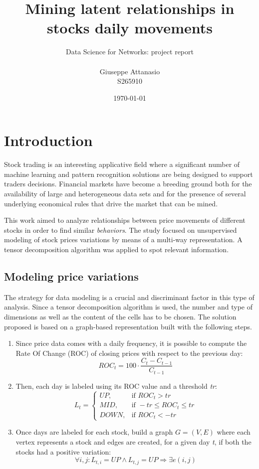 \documentclass[12pt]{extarticle}
\title{Mining latent relationships in stocks daily movements}
\author{Data Science for Networks: project report\\\\Giuseppe Attanasio\\ S265910}
\date{\today}
\begin{document}
\maketitle
\newpage

\section{Introduction}

Stock trading is an interesting applicative field where a significant number of machine learning and pattern recognition solutions are being designed to support traders decisions. Financial markets have become a breeding ground both for the availability of large and heterogeneous data sets and for the presence of several underlying economical rules that drive the market that can be mined. 

This work aimed to analyze relationships between price movements of different stocks in order to find similar \textit{behaviors}. The study focused on unsupervised modeling of stock prices variations by means of a multi-way representation. A tensor decomposition algorithm was applied to spot relevant information. 

\subsection{Modeling price variations}

The strategy for data modeling is a crucial and discriminant factor in this type of analysis. Since a tensor decomposition algorithm is used, the number and type of dimensions as well as the content of the cells has to be chosen.
The solution proposed is based on a graph-based representation built with the following steps.

\begin{enumerate}
    \item Since price data comes with a daily frequency, it is possible to compute the Rate Of Change (ROC) of closing prices with respect to the previous day: 
    \begin{equation}
        ROC_t = 100 \cdot \frac{C_t - C_{t-1}}{C_{t-1}}
    \end{equation}
    \item Then, each day is labeled using its ROC value and a threshold \textit{tr}:
    $$
        L_t = 
    	\begin{cases}
    		UP, & \text{if } ROC_t > tr \\
    		MID, & \text{if } -tr \leq ROC_t \leq tr \\
    		DOWN, & \text{if } ROC_t < -tr
    	\end{cases}
    $$
    \item Once days are labeled for each stock, build a graph $G = (V,E)$ where each vertex represents a stock and edges are created, for a given day \textit{t}, if both the stocks had a positive variation:
    \begin{equation}
        \forall i,j: L_{t,i} = UP \wedge L_{t,j} = UP \Rightarrow \exists e(i,j)
    \end{equation}
\end{enumerate}
\end{document}
